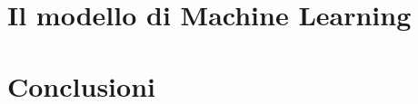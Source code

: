 \documentclass[fleqn,10pt]{SelfArx} %
\begin{document}
\section{Il modello di Machine Learning}
\lipsum
\section{Conclusioni}
\lipsum




\end{document}

